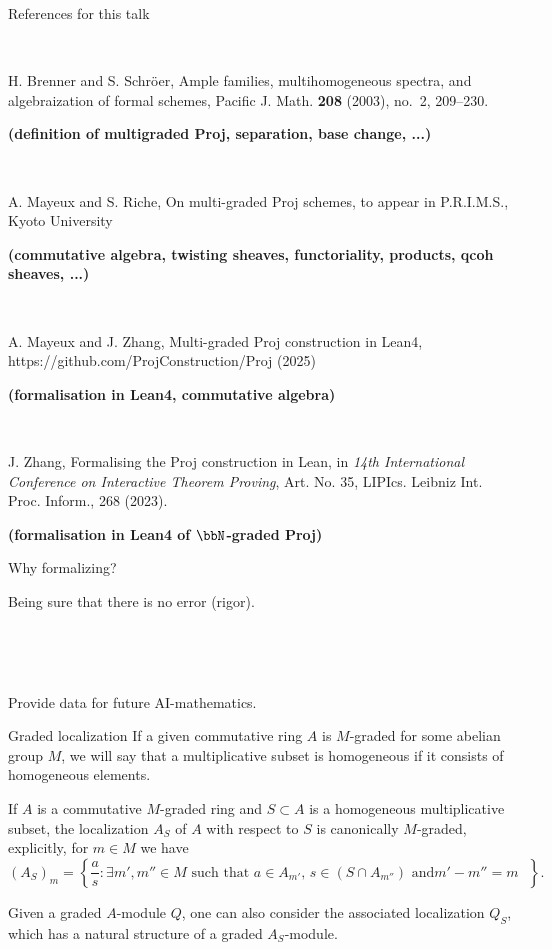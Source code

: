 \documentclass[9pt]{beamer}
\begin{document}
\begin{frame}{References for this talk }

$~~$

H. Brenner and S. Schr\"oer, Ample families, multihomogeneous spectra, and algebraization of formal schemes, Pacific J. Math. {\bf 208} (2003), no.~2, 209--230.

\textbf{
(definition of multigraded Proj, separation, base change, ...)}

$~~$

A. Mayeux and S. Riche, On multi-graded Proj schemes, to appear in P.R.I.M.S., Kyoto University

\textbf{
(commutative algebra, twisting sheaves, functoriality, products, qcoh sheaves, ...)}

$~~$


A. Mayeux and J. Zhang, Multi-graded Proj construction in Lean4, https://github.com/ProjConstruction/Proj (2025)

\textbf{
(formalisation in Lean4, commutative algebra)}

$~~$

J. Zhang, Formalising the Proj construction in Lean, in {\it 14th International Conference on Interactive Theorem Proving}, Art. No. 35, LIPIcs. Leibniz Int. Proc. Inform., 268 (2023).

\textbf{
(formalisation in Lean4 of $\bbN$-graded Proj)}
\end{frame}


\begin{frame}{Why formalizing? }

Being sure that there is no error (rigor).

$~~$

$~~$

Provide data for future AI-mathematics.




\end{frame}


\begin{frame}{Graded localization}
If a given commutative ring $A$ is $M$-graded for some abelian group $M$, we will say that a multiplicative subset is homogeneous if it consists of homogeneous elements. 

If $A$ is a commutative $M$-graded ring and $S \subset A$ is a homogeneous multiplicative subset, the localization $A_S$ of $A$ with respect to $S$ is canonically $M$-graded, explicitly, for $m \in M$ we have
\[
( A_S)_m =  \left\{ \frac{a}{s} : \exists m', m'' \in M \text{ such that }  a \in A_{m'}, \, s \in (S \cap A_{m''}) \text{ and
$m'-m'' =m$ }\right\}.
\]


Given a graded $A$-module $Q$, one can also consider the associated localization $Q_S$, which has a natural structure of a graded $A_S$-module.

\end{frame}
\end{document}
